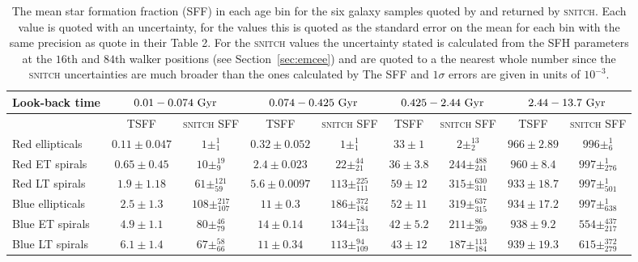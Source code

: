\documentclass[useAMS,usenatbib]{mn2e}
\begin{document}
\begin{table*}
\centering
\caption{The mean star formation fraction (SFF) in each age bin for the six galaxy samples quoted by \protect\cite[][TSFF]{tojeiro13} and returned by \textsc{snitch}. Each value is quoted with an uncertainty, for the \protect\cite{tojeiro13} values this is quoted as the standard error on the mean for each bin with the same precision as \protect\citeauthor{tojeiro13} quote in their Table 2. For the \textsc{snitch} values the uncertainty stated is calculated from the SFH parameters at the $16$th and $84$th walker positions (see Section~\ref{sec:emcee}) and are quoted to a the nearest whole number since the \textsc{snitch} uncertainties are much broader than the ones calculated by \protect\citeauthor{tojeiro13} The SFF and $1\sigma$ errors are given in units of $10^{-3}$.}
\label{table:tojeirocompare}
\begin{tabular*}{\textwidth}{l|cc|cc|cc|cc}
                        Look-back time & \multicolumn{2}{c|}{$0.01 - 0.074~\rm{Gyr}$}     & \multicolumn{2}{c|}{$0.074 - 0.425~\rm{Gyr}$} & \multicolumn{2}{c|}{$0.425 - 2.44~\rm{Gyr}$} & \multicolumn{2}{c}{$2.44 - 13.7~\rm{Gyr}$} \\ \hline
                        & TSFF & \textsc{snitch} SFF & TSFF          & \textsc{snitch} SFF          & TSFF          & \textsc{snitch} SFF         & TSFF         & \textsc{snitch} SFF        \\ \hline
Red ellipticals         & $0.11\pm0.047$   &  $1\pm_{1}^{1}$ &  $0.32\pm0.052$  &    $1\pm_{1}^{1}$   &  $33\pm1$   &   $2\pm_{2}^{13}$   &  $966\pm2.89$  &   $996\pm_{6}^{1}$   \\
Red ET spirals  & $0.65\pm0.45$   &  $10\pm_{9}^{19}$ &  $2.4\pm0.023$   &  $22\pm_{21}^{44}$     &  $36\pm3.8$   &   $244\pm_{241}^{488}$  &  $960\pm8.4$  &  $997\pm_{276}^{1}$    \\
Red LT spirals   &  $1.9\pm1.18$   &  $61\pm_{59}^{121}$  &  $5.6\pm0.0097$   &   $113\pm_{111}^{225}$    &  $59\pm12$   &   $315\pm_{311}^{630}$   &  $933\pm18.7$  &   $997\pm_{501}^{1}$    \\ \hline
Blue ellipticals        &  $2.5\pm1.3$   &  $108\pm_{107}^{217}$   &  $11\pm0.3$    &   $186\pm_{184}^{372}$    &  $52\pm11$   &   $319\pm_{315}^{637}$   &  $934\pm17.2$  &     $997\pm_{638}^{1}$ \\
Blue ET spirals &  $4.9\pm1.1$   &  $80\pm_{79}^{46}$  &  $14\pm0.14$    &   $134\pm_{133}^{74}$    &  $42\pm5.2$   &   $211\pm_{209}^{86}$   &  $938\pm9.2$  &  $554\pm_{217}^{437}$     \\
Blue LT spirals  &  $6.1\pm1.4$   &  $67\pm_{66}^{58}$  &  $11\pm0.34$   &   $113\pm_{109}^{94}$    &  $43\pm12$   &    $187\pm_{184}^{113}$  &  $939\pm19.3$  & $615\pm_{279}^{372}$                              
\end{tabular*}
\end{table*}
\end{document}
